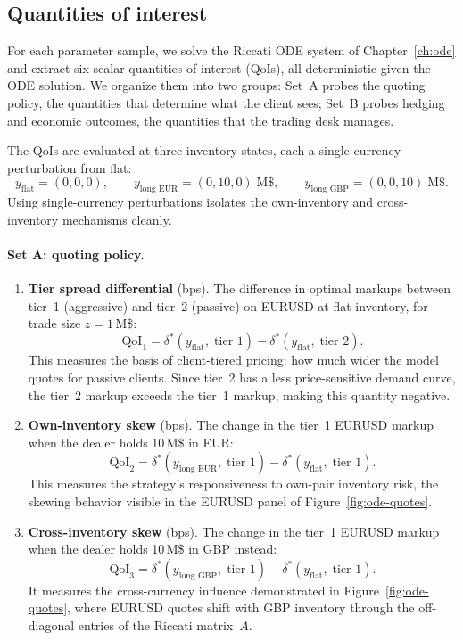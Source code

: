 \subsection{Quantities of interest}
\label{sec:sa-qois}

For each parameter sample, we solve the Riccati ODE system of Chapter~\ref{ch:ode} and extract six scalar quantities of interest (QoIs), all deterministic given the ODE solution. We organize them into two groups: Set~A probes the quoting policy, the quantities that determine what the client sees; Set~B probes hedging and economic outcomes, the quantities that the trading desk manages.

The QoIs are evaluated at three inventory states, each a single-currency perturbation from flat:
\[
  y_{\text{flat}} = (0, 0, 0), \qquad y_{\text{long EUR}} = (0, 10, 0)\;\text{M\$}, \qquad y_{\text{long GBP}} = (0, 0, 10)\;\text{M\$}.
\]
Using single-currency perturbations isolates the own-inventory and cross-inventory mechanisms cleanly.

\paragraph{Set A: quoting policy.}

\begin{enumerate}
  \item \textbf{Tier spread differential} (bps). The difference in optimal markups between tier~1 (aggressive) and tier~2 (passive) on EURUSD at flat inventory, for trade size $z = 1$\,M\$:
  \[
    \text{QoI}_1 = \delta^*(y_{\text{flat}},\; \text{tier 1}) - \delta^*(y_{\text{flat}},\; \text{tier 2}).
  \]
  This measures the basis of client-tiered pricing: how much wider the model quotes for passive clients. Since tier~2 has a less price-sensitive demand curve, the tier~2 markup exceeds the tier~1 markup, making this quantity negative.

  \item \textbf{Own-inventory skew} (bps). The change in the tier~1 EURUSD markup when the dealer holds 10\,M\$ in EUR:
  \[
    \text{QoI}_2 = \delta^*(y_{\text{long EUR}},\; \text{tier 1}) - \delta^*(y_{\text{flat}},\; \text{tier 1}).
  \]
  This measures the strategy's responsiveness to own-pair inventory risk, the skewing behavior visible in the EURUSD panel of Figure~\ref{fig:ode-quotes}.

  \item \textbf{Cross-inventory skew} (bps). The change in the tier~1 EURUSD markup when the dealer holds 10\,M\$ in GBP instead:
  \[
    \text{QoI}_3 = \delta^*(y_{\text{long GBP}},\; \text{tier 1}) - \delta^*(y_{\text{flat}},\; \text{tier 1}).
  \]
  It measures the cross-currency influence demonstrated in Figure~\ref{fig:ode-quotes}, where EURUSD quotes shift with GBP inventory through the off-diagonal entries of the Riccati matrix~$A$.
\end{enumerate}

